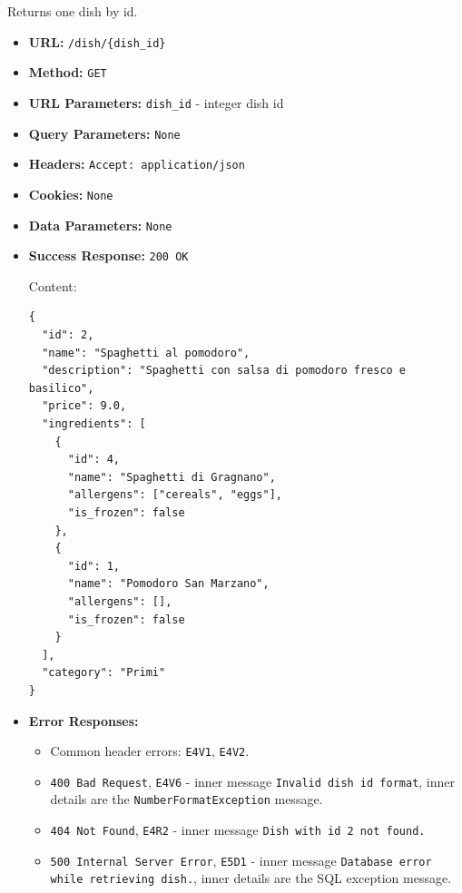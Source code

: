 Returns one dish by id.

\begin{itemize}[nosep]
\item \textbf{URL:} \texttt{/dish/\{dish\_id\}}

\item \textbf{Method:} \texttt{GET}

\item \textbf{URL Parameters:} \texttt{dish\_id} - integer dish id

\item \textbf{Query Parameters:} \texttt{None}

\item \textbf{Headers:} \texttt{Accept: application/json}

\item \textbf{Cookies:} \texttt{None}

\item \textbf{Data Parameters:} \texttt{None}

\item \textbf{Success Response:} \texttt{200 OK}

Content:

\begin{lstlisting}
{
  "id": 2,
  "name": "Spaghetti al pomodoro",
  "description": "Spaghetti con salsa di pomodoro fresco e basilico",
  "price": 9.0,
  "ingredients": [
    {
      "id": 4,
      "name": "Spaghetti di Gragnano",
      "allergens": ["cereals", "eggs"],
      "is_frozen": false
    },
    {
      "id": 1,
      "name": "Pomodoro San Marzano",
      "allergens": [],
      "is_frozen": false
    }
  ],
  "category": "Primi"
}
\end{lstlisting}

\item \textbf{Error Responses:}

\begin{itemize}[nosep]
\item Common header errors: \texttt{E4V1}, \texttt{E4V2}.
\item \texttt{400 Bad Request}, \texttt{E4V6} - inner message \texttt{Invalid dish id format}, inner details are the \texttt{NumberFormatException} message.
\item \texttt{404 Not Found}, \texttt{E4R2} - inner message \texttt{Dish with id 2 not found.}
\item \texttt{500 Internal Server Error}, \texttt{E5D1} - inner message \texttt{Database error while retrieving dish.}, inner details are the SQL exception message.
\end{itemize}

\end{itemize}

